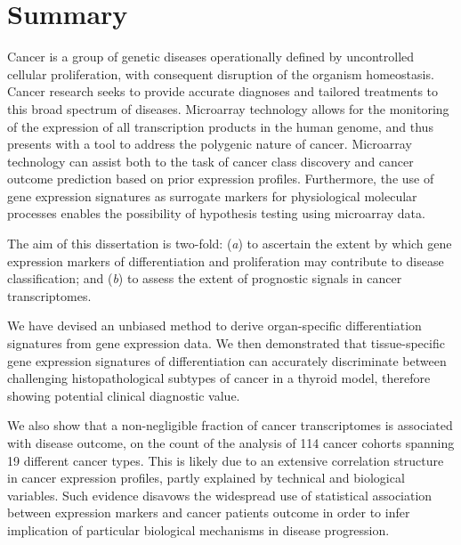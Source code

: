 \clearpage

\blankpage

\chapter*{Summary}

Cancer is a group of genetic diseases operationally defined by uncontrolled
cellular proliferation, with consequent disruption of the organism
homeostasis.  Cancer research seeks to provide accurate diagnoses and tailored
treatments to this broad spectrum of diseases.  Microarray technology allows for
the monitoring of the expression of all transcription products in the human
genome, and thus presents with a tool to address the polygenic nature of cancer.
Microarray technology can assist both to the task of cancer class discovery and
cancer outcome prediction based on prior expression profiles.  Furthermore, the
use of gene expression signatures as surrogate markers for physiological
molecular processes enables the possibility of hypothesis testing using
microarray data.

The aim of this dissertation is two-fold: (\emph{a}) to ascertain the extent by
which gene expression markers of differentiation and proliferation may
contribute to disease classification; and (\emph{b}) to assess the extent of
prognostic signals in cancer transcriptomes.

We have devised an unbiased method to derive organ-specific differentiation
signatures from gene expression data.  We then demonstrated that tissue-specific
gene expression signatures of differentiation can accurately discriminate
between challenging histopathological subtypes of cancer in a thyroid model,
therefore showing potential clinical diagnostic value.

We also show that a non-negligible fraction of cancer transcriptomes is
associated with disease outcome, on the count of the analysis of 114 cancer
cohorts spanning 19 different cancer types.  This is likely due to an extensive
correlation structure in cancer expression profiles, partly explained by
technical and biological variables.  Such evidence disavows the widespread use
of statistical association between expression markers and cancer patients
outcome in order to infer implication of particular biological mechanisms in
disease progression.


\clearpage

